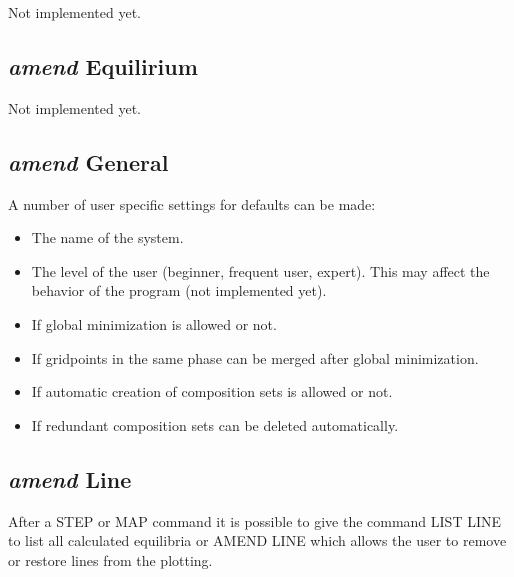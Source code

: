\documentclass[12pt]{article}
\begin{document}
Not implemented yet.

\subsection{{\em amend} Equilirium}

Not implemented yet.

\subsection{{\em amend} General}

A number of user specific settings for defaults can be made:

\begin{itemize}
\item The name of the system.
\item The level of the user (beginner, frequent user, expert).  This
  may affect the behavior of the program (not implemented yet).
\item If global minimization is allowed or not.
\item If gridpoints in the same phase can be merged after global
  minimization.
\item  If automatic creation of composition sets is allowed or not.
\item  If redundant composition sets can be deleted automatically.
\end{itemize}

\subsection{{\em amend} Line}

After a STEP or MAP command it is possible to give the command LIST LINE
to list all calculated equilibria or AMEND LINE which allows the user
to remove or restore lines from the plotting.
\end{document}
